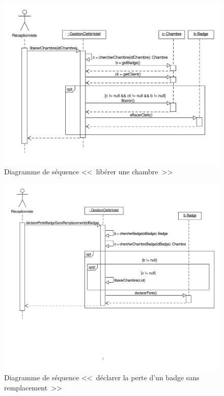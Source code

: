 \documentclass[11pt,article]{article}
\begin{document}
\begin{figure}[h!]
\begin{center}
\includegraphics[scale=0.4]{DiagrammesDeSequence/gestionclefshotel_uml_diag_seq_liberer_chambre}
\caption{Diagramme de séquence <<~libérer une chambre~>>}
\end{center}
\label{umlet_diag_classes}
\end{figure}

\begin{figure}[h!]
\begin{center}
\includegraphics[scale=0.4]{DiagrammesDeSequence/gestionclefshotel_uml_diag_seq_declarer_perte_badge_sans_remplacement}
\caption{Diagramme de séquence <<~déclarer la perte d'un badge sans remplacement~>>}
\end{center}
\label{umlet_diag_classes}
\end{figure}
\end{document}
